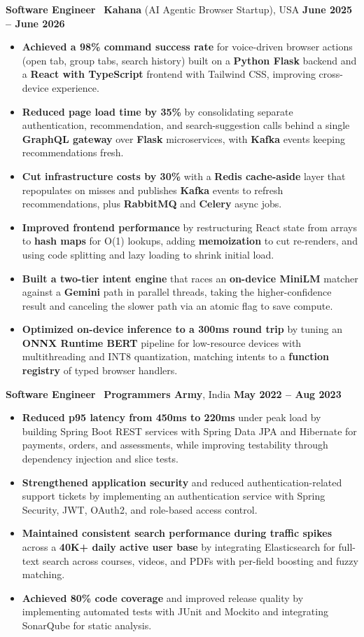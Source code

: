 \documentclass[a4paper,9pt]{extarticle}
\begin{document}
\textbf{Software Engineer} \textbar\ \textbf{Kahana} (AI Agentic Browser Startup), USA \hfill \textbf{June 2025 -- June 2026}
\begin{itemize}
  \item \textbf{Achieved a 98\% command success rate} for voice-driven browser actions (open tab, group tabs, search history) built on a \textbf{Python Flask} backend and a \textbf{React with TypeScript} frontend with Tailwind CSS, improving cross-device experience.
  \item \textbf{Reduced page load time by 35\%} by consolidating separate authentication, recommendation, and search-suggestion calls behind a single \textbf{GraphQL gateway} over \textbf{Flask} microservices, with \textbf{Kafka} events keeping recommendations fresh.
  \item \textbf{Cut infrastructure costs by 30\%} with a \textbf{Redis cache-aside} layer that repopulates on misses and publishes \textbf{Kafka} events to refresh recommendations, plus \textbf{RabbitMQ} and \textbf{Celery} async jobs.
  \item \textbf{Improved frontend performance} by restructuring React state from arrays to \textbf{hash maps} for O(1) lookups, adding \textbf{memoization} to cut re-renders, and using code splitting and lazy loading to shrink initial load.
  \item \textbf{Built a two-tier intent engine} that races an \textbf{on-device MiniLM} matcher against a \textbf{Gemini} path in parallel threads, taking the higher-confidence result and canceling the slower path via an atomic flag to save compute.
  \item \textbf{Optimized on-device inference to a 300ms round trip} by tuning an \textbf{ONNX Runtime BERT} pipeline for low-resource devices with multithreading and INT8 quantization, matching intents to a \textbf{function registry} of typed browser handlers.
\end{itemize}

\textbf{Software Engineer} \textbar\ \textbf{Programmers Army}, India \hfill \textbf{May 2022 -- Aug 2023}
\begin{itemize}
  \item \textbf{Reduced p95 latency from 450ms to 220ms} under peak load by building Spring Boot REST services with Spring Data JPA and Hibernate for payments, orders, and assessments, while improving testability through dependency injection and slice tests.
  \item \textbf{Strengthened application security} and reduced authentication-related support tickets by implementing an authentication service with Spring Security, JWT, OAuth2, and role-based access control.
  \item \textbf{Maintained consistent search performance during traffic spikes} across a \textbf{40K+ daily active user base} by integrating Elasticsearch for full-text search across courses, videos, and PDFs with per-field boosting and fuzzy matching.
  \item \textbf{Achieved 80\% code coverage} and improved release quality by implementing automated tests with JUnit and Mockito and integrating SonarQube for static analysis.
\end{itemize}
\end{document}
